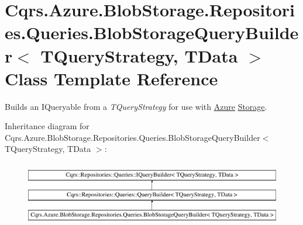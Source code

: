 \hypertarget{classCqrs_1_1Azure_1_1BlobStorage_1_1Repositories_1_1Queries_1_1BlobStorageQueryBuilder}{}\section{Cqrs.\+Azure.\+Blob\+Storage.\+Repositories.\+Queries.\+Blob\+Storage\+Query\+Builder$<$ T\+Query\+Strategy, T\+Data $>$ Class Template Reference}
\label{classCqrs_1_1Azure_1_1BlobStorage_1_1Repositories_1_1Queries_1_1BlobStorageQueryBuilder}


Builds an I\+Queryable from a {\itshape T\+Query\+Strategy}  for use with \hyperlink{namespaceCqrs_1_1Azure}{Azure} \hyperlink{namespaceCqrs_1_1Azure_1_1Storage}{Storage}.  


Inheritance diagram for Cqrs.\+Azure.\+Blob\+Storage.\+Repositories.\+Queries.\+Blob\+Storage\+Query\+Builder$<$ T\+Query\+Strategy, T\+Data $>$\+:\begin{figure}[H]
\begin{center}
\leavevmode
\includegraphics[height=2.876712cm]{classCqrs_1_1Azure_1_1BlobStorage_1_1Repositories_1_1Queries_1_1BlobStorageQueryBuilder}
\end{center}
\end{figure}
